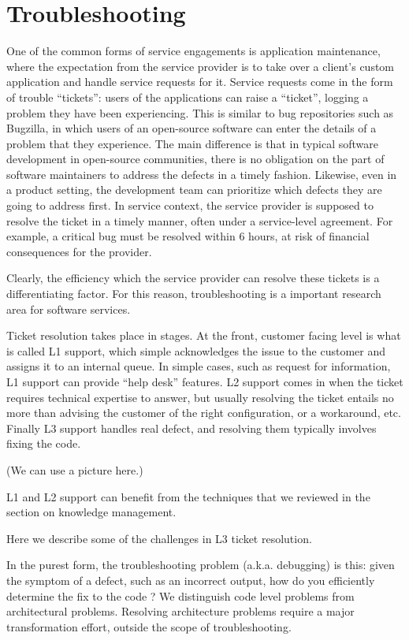 \section{Troubleshooting}

One of the common forms of service engagements is application maintenance, where the expectation from the service provider is to take over a client's custom application and handle service requests for it.  Service requests come in the form of trouble ``tickets'': users of the applications can raise a ``ticket'', logging a problem they have been experiencing. This is similar to bug repositories such as Bugzilla, in which users of an open-source software can enter the details of a problem that they experience.  The main difference is that in typical software development in open-source communities, there is no obligation on the part of software maintainers to address the defects in a timely fashion. Likewise, even in a product setting, the development team can prioritize which defects they are going to address first.  In service context, the service provider is supposed to resolve the ticket in a timely manner, often under a service-level agreement. For example, a critical bug must be resolved within 6 hours, at risk of financial consequences for the provider. 

Clearly, the efficiency which the service provider can resolve these tickets is a differentiating factor. For this reason, troubleshooting is a important research area for software services.

Ticket resolution takes place in stages. At the front, customer facing level is what is called L1 support, which simple acknowledges the issue to the customer and assigns it to an internal queue. In simple cases, such as request for information, L1 support can provide ``help desk'' features. L2 support comes in when the ticket requires technical expertise to answer, but usually resolving the ticket entails no more than advising the customer of the right configuration, or a workaround, etc. Finally L3 support handles real defect, and resolving them typically involves fixing the code.

(We can use a picture here.)

L1 and L2 support can benefit from the techniques that we reviewed in the section on knowledge management.

Here we describe some of the challenges in L3 ticket resolution.

In the purest form, the troubleshooting problem (a.k.a. debugging) is this: given the symptom of a defect, such as an incorrect output, how do you efficiently determine the fix to the code ?  We distinguish code level problems from architectural problems. Resolving architecture problems require a major transformation effort, outside the scope of troubleshooting.

